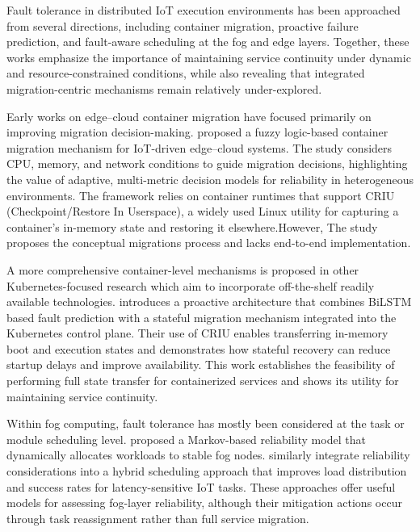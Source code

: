\documentclass{article}
\begin{document}
Fault tolerance in distributed IoT execution environments has been approached from several directions, including container migration, proactive failure prediction, and fault-aware scheduling at the fog and edge layers. Together, these works emphasize the importance of maintaining service continuity under dynamic and resource-constrained conditions, while also revealing that integrated migration-centric mechanisms remain relatively under-explored.


Early works on edge–cloud container migration have focused primarily on improving migration decision-making. \cite{palaContainerMigrationApproach2025} proposed a fuzzy logic-based container migration mechanism for IoT-driven edge–cloud systems. The study considers CPU, memory, and network conditions to guide migration decisions, highlighting the value of adaptive, multi-metric decision models for reliability in heterogeneous environments. The framework relies on container runtimes that support CRIU (Checkpoint/Restore In Userspace), a widely used Linux utility for capturing a container’s in-memory state and restoring it elsewhere.However, The study proposes the conceptual migrations process and lacks end-to-end implementation. 


A more comprehensive container-level mechanisms is proposed in other Kubernetes-focused research which aim to incorporate off-the-shelf readily available technologies. \cite{tranProactiveStatefulFaultTolerant2022} introduces a proactive architecture that combines BiLSTM based fault prediction with a stateful migration mechanism integrated into the Kubernetes control plane. Their use of CRIU enables transferring in-memory boot and execution states and demonstrates how stateful recovery can reduce startup delays and improve availability. This work establishes the feasibility of performing full state transfer for containerized services and shows its utility for maintaining service continuity.


Within fog computing, fault tolerance has mostly been considered at the task or module scheduling level. \cite{zhangFaultTolerantModelPerformance2022d} proposed a Markov-based reliability model that dynamically allocates workloads to stable fog nodes. \cite{kashyapHybridApproachFaulttolerance2024b} similarly integrate reliability considerations into a hybrid scheduling approach that improves load distribution and success rates for latency-sensitive IoT tasks. These approaches offer useful models for assessing fog-layer reliability, although their mitigation actions occur through task reassignment rather than full service migration.
\end{document}
